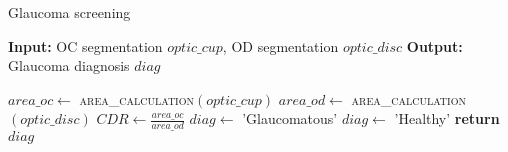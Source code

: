 \begin{algorithm}[!htbp]

	\caption{Glaucoma screening}
	\label{alg:glaucomascreening}
	{\fontsize{10}{9}\selectfont
	\begin{algorithmic}[1]
		\State \textbf{Input:} OC segmentation $optic\_cup$, OD segmentation $optic\_disc$
		\State \textbf{Output:} Glaucoma diagnosis $diag$
		\medbreak
		
		
		\State $area\_oc \gets$ \textsc{area\_calculation}$(optic\_cup)$
		\State $area\_od \gets$ \textsc{area\_calculation}$(optic\_disc)$
		\State $CDR \gets \frac{area\_oc}{area\_od}$
		\medbreak
			\State $diag \gets$ 'Glaucomatous'
		\Else
			\State $diag \gets$ 'Healthy'
		\EndIf
		\medbreak
		\State \textbf{return} $diag$
		\EndFunction
		
	\end{algorithmic}
	}
\end{algorithm}